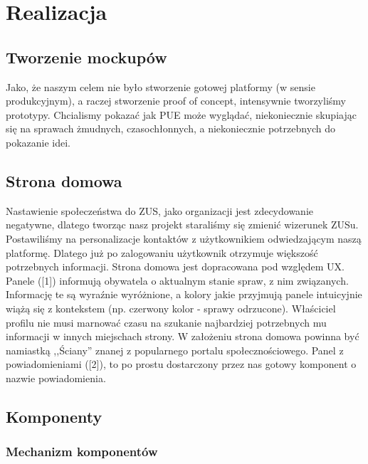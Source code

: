 \documentclass[licencjacka]{pracamgr}
\begin{document}
\chapter{Realizacja}

\section{Tworzenie mockupów}
Jako, że naszym celem nie było stworzenie gotowej platformy (w sensie produkcyjnym), a raczej stworzenie proof of concept,
intensywnie tworzyliśmy prototypy. Chcialismy pokazać jak PUE może wyglądać, niekoniecznie skupiając się na
sprawach żmudnych, czasochłonnych, a niekoniecznie potrzebnych do pokazanie idei.

\section{Strona domowa}
Nastawienie społeczeństwa do ZUS, jako organizacji jest zdecydowanie negatywne, dlatego tworząc nasz projekt staraliśmy się
zmienić wizerunek ZUSu. Postawiliśmy na personalizacje kontaktów z użytkownikiem odwiedzającym naszą platformę. Dlatego już po zalogowaniu
użytkownik otrzymuje większość potrzebnych informacji. Strona domowa jest dopracowana pod względem UX. Panele ([1]) informują
obywatela o aktualnym stanie spraw, z nim związanych. Informację te są wyraźnie wyróżnione, a kolory jakie przyjmują panele
intuicyjnie wiążą się z kontekstem (np. czerwony kolor - sprawy odrzucone). Właściciel profilu nie musi marnować czasu
na szukanie najbardziej potrzebnych mu informacji w innych miejschach strony. W założeniu strona domowa powinna być
namiastką ,,Ściany'' znanej z popularnego portalu społecznościowego. Panel z powiadomieniami ([2]), to po prostu dostarczony
przez nas gotowy komponent o nazwie powiadomienia.

\section{Komponenty}
\subsection{Mechanizm komponentów}
\end{document}
